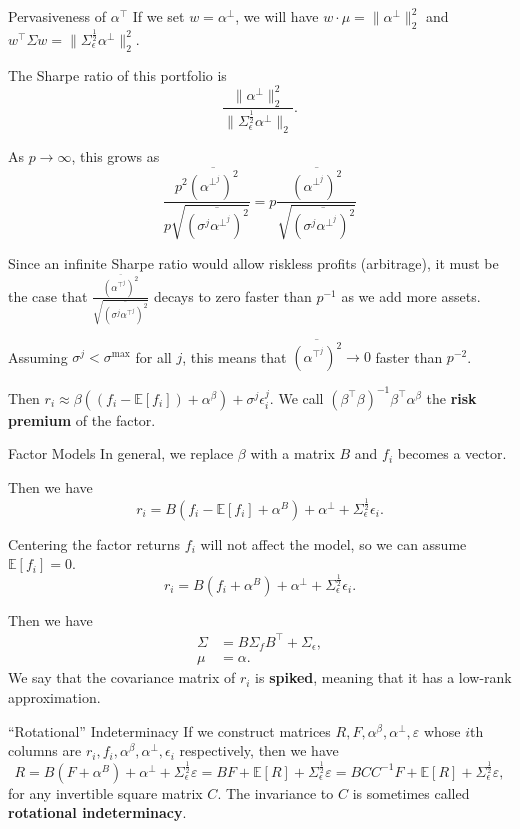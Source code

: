 \documentclass{beamer}
\begin{document}
\begin{frame}{Pervasiveness of $\alpha^\top$}
	If we set $w = \alpha^\bot$, we will have $w\cdot\mu = \|\alpha^\bot\|_2^2$ and $w^\top\Sigma w = \|\Sigma_\epsilon^\frac{1}{2} \alpha^\bot\|_2^2$.

	The Sharpe ratio of this portfolio is
	$$\frac{\|\alpha^\bot\|_2^2}{\|\Sigma_\epsilon^\frac{1}{2}\alpha^\bot\|_2}.$$

	As $p\to\infty$, this grows as
	$$\frac{p^2 \overline{(\alpha^\bot^j)^2}}{p \sqrt{\overline{(\sigma^j \alpha^\bot^j)^2}}} = p \frac{\overline{(\alpha^\bot^j)^2}}{\sqrt{\overline{(\sigma^j \alpha^\bot^j)^2}}} $$

	Since an infinite Sharpe ratio would allow riskless profits (arbitrage), it must be the case that $\frac{\overline{(\alpha^\top^j)^2}}{\sqrt{\overline{(\sigma^j\alpha^\top^j)^2}}}$ decays to zero faster than $p^{-1}$ as we add more assets.

	Assuming $\sigma^j<\sigma^{\max}$ for all $j$, this means that $\overline{(\alpha^\top^j)^2}\to 0$ faster than $p^{-2}$.

	Then $r_i \approx \beta ((f_i-\mathbb{E}[f_i]) + \alpha^\beta) + \sigma^j\epsilon_i^j$. We call $(\beta^\top \beta)^{-1}\beta^\top\alpha^\beta$ the \textbf{risk premium} of the factor.

\end{frame}

\begin{frame}{Factor Models}
	In general, we replace $\beta$ with a matrix $B$ and $f_i$ becomes a vector.

	Then we have
	$$r_i = B(f_i-\mathbb{E}[f_i] + \alpha^B) + \alpha^\bot + \Sigma_\epsilon^\frac{1}{2}\epsilon_i.$$

	Centering the factor returns $f_i$ will not affect the model, so we can assume $\mathbb{E}[f_i]=0$.
	$$r_i = B(f_i + \alpha^B) + \alpha^\bot + \Sigma_\epsilon^\frac{1}{2}\epsilon_i.$$

	Then we have
	\begin{align*}
		\Sigma	&= B \Sigma_f B^\top + \Sigma_\epsilon,
	\\	\mu	&= \alpha.
	\end{align*}
	We say that the covariance matrix of $r_i$ is \textbf{spiked}, meaning that it has a low-rank approximation.
\end{frame}

\begin{frame}{``Rotational'' Indeterminacy}
	If we construct matrices $R,F,\alpha^\beta,\alpha^\bot,\varepsilon$ whose $i$th columns are $r_i,f_i,\alpha^\beta,\alpha^\bot,\epsilon_i$ respectively, then we have
	$$R = B(F + \alpha^B) + \alpha^\bot + \Sigma_\epsilon^\frac{1}{2}\varepsilon = BF + \mathbb{E}[R] + \Sigma_\epsilon^\frac{1}{2}\varepsilon = BCC^{-1}F + \mathbb{E}[R] + \Sigma_\epsilon^\frac{1}{2}\varepsilon,$$
	for any invertible square matrix $C$. The invariance to $C$ is sometimes called \textbf{rotational indeterminacy}.
\end{frame}
\end{document}

